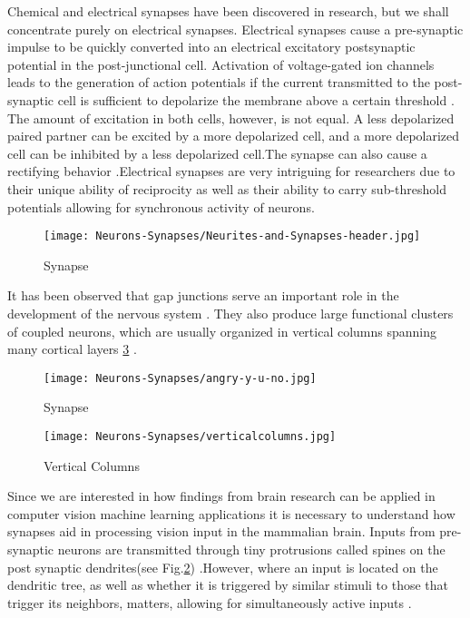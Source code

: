 \documentclass[12pt]{report}
\begin{document}
Chemical and electrical synapses have been discovered in research, but we shall concentrate purely on electrical synapses. Electrical synapses cause a pre-synaptic impulse to be quickly converted into an electrical excitatory postsynaptic potential in the post-junctional cell. Activation of voltage-gated ion channels leads to the generation of action potentials if the current transmitted to the post-synaptic cell is sufficient to depolarize the membrane above a certain threshold \cite{Hormuzdi2004}. The amount of excitation in both cells, however, is not equal. A less depolarized paired partner can be excited by a more depolarized cell, and a more depolarized cell can be inhibited by a less depolarized cell.The synapse can also cause a rectifying behavior \cite{Furshpan1959}.Electrical synapses are very intriguing for researchers due to their unique ability of reciprocity as well as their ability to carry sub-threshold potentials allowing for synchronous activity of neurons.

\begin{figure}[htp]
    \centering
    \texttt{[image: Neurons-Synapses/Neurites-and-Synapses-header.jpg]}
    \caption{Synapse}
    \label{fig:synapse}
\end{figure}

It has been observed that gap junctions serve an important role in the development of the nervous system . They also produce large functional clusters of coupled neurons, which are usually organized in vertical columns spanning many cortical layers \cite{Fischbach1972} \cite{Peinado1993}\cite{Yuste1992} \ref{fig:verticalcolumns} .


\begin{figure}[htp]
    \centering
    \texttt{[image: Neurons-Synapses/angry-y-u-no.jpg]}
    \caption{Synapse}
    \label{fig:spines}
\end{figure}

\begin{figure}[htp]
    \centering
    \texttt{[image: Neurons-Synapses/verticalcolumns.jpg]}
    \caption{Vertical Columns \cite{molnar2020}}
    \label{fig:verticalcolumns}
\end{figure}
Since we are interested in how findings from brain research can be applied in computer vision machine learning applications it is necessary to understand how synapses aid in processing vision input in the mammalian brain. Inputs from pre-synaptic neurons are transmitted through tiny protrusions called spines on the post synaptic dendrites(see Fig.\ref{fig:spines}) \cite{tobias2017}.However, where an input is located on the dendritic tree, as well as whether it is triggered by similar stimuli to those that trigger its neighbors, matters, allowing for simultaneously active inputs \cite{London2005}.
\end{document}
